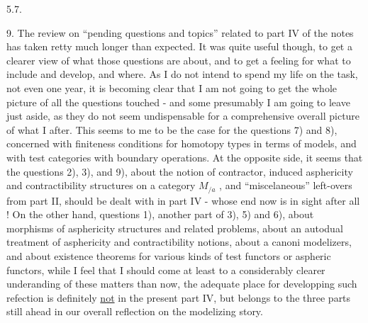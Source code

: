 
5.7.

9. The review on ``pending questions and topics'' related to part IV
of the notes has taken retty much longer than expected. It was quite
useful though, to get a clearer view of what those questions are about,
and to get a feeling for what to include and develop, and where. As I
do not intend to spend my life on the task, not even one year, it is
becoming clear that I am not going to get the whole picture of all the
questions touched - and some presumably I am going to leave just
aside, as they do not seem undispensable for a comprehensive overall
picture of what I after. This seems to me to be the case for the
questions 7) and 8), concerned with finiteness conditions for homotopy
types in terms of models, and  with test categories with
boundary operations. At the opposite side, it seems that the questions
2),  3), and 9), about the notion of contractor, induced asphericity
and contractibility structures on a category $M_{/a}$ , and ``miscelaneous''
left-overs from part II, should be dealt with in part IV - whose end
now is in sight after all ! On the other hand, questions 1), another
part of 3), 5) and  6), about morphisms of asphericity structures
and related problems, about an autodual treatment of asphericity and
contractibility notions, about a   canoni
modelizers, and about existence theorems for various kinds of test
functors or aspheric functors, while I feel that I should come  at
least to a considerably clearer underanding of these matters than now,
the adequate place for developping such refection is definitely \uline{not} in
the present part IV, but belongs to  the three parts still ahead in our
overall reflection on the modelizing story.

